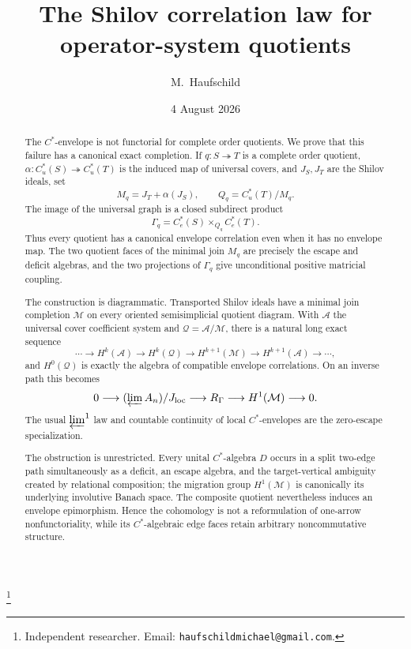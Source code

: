 \documentclass[11pt,a4paper]{amsart}
\theoremstyle{plain}
\theoremstyle{definition}
\newcommand{\Cu}{C_u^*}
\newcommand{\Ce}{C_e^*}
\begin{document}
\title[The Shilov correlation law]{The Shilov correlation law for operator-system quotients}

\author{M.~Haufschild}
\thanks{Independent researcher. Email: \texttt{haufschildmichael@gmail.com}.}

\date{4 August 2026}


\begin{abstract}
The $C^*$-envelope is not functorial for complete order quotients.  We prove that this failure has
a canonical exact completion.  If $q:S\twoheadrightarrow T$ is a complete order quotient,
$\alpha:\Cu(S)\twoheadrightarrow\Cu(T)$ is the induced map of universal covers, and $J_S,J_T$
are the Shilov ideals, set
\[
 M_q=J_T+\alpha(J_S),\qquad Q_q=\Cu(T)/M_q .
\]
The image of the universal graph is a closed subdirect product
\[
 \Gamma_q=\Ce(S)\times_{Q_q}\Ce(T).
\]
Thus every quotient has a canonical envelope correlation even when it has no envelope map.
The two quotient faces of the minimal join $M_q$ are precisely the escape and deficit algebras,
and the two projections of $\Gamma_q$ give unconditional positive matricial coupling.

The construction is diagrammatic.  Transported Shilov ideals have a minimal join completion
$\mathcal M$ on every oriented semisimplicial quotient diagram.  With $\mathcal A$ the universal
cover coefficient system and $\mathcal Q=\mathcal A/\mathcal M$, there is a natural long exact
sequence
\[
 \cdots\longrightarrow H^k(\mathcal A)\longrightarrow H^k(\mathcal Q)
 \longrightarrow H^{k+1}(\mathcal M)\longrightarrow H^{k+1}(\mathcal A)
 \longrightarrow\cdots ,
\]
and $H^0(\mathcal Q)$ is exactly the algebra of compatible envelope correlations.  On an inverse
path this becomes
\[
 0\longrightarrow(\varprojlim A_n)/J_{\rm loc}\longrightarrow R_\Gamma
 \longrightarrow H^1(\mathcal M)\longrightarrow0.
\]
The usual $\varprojlim^1$ law and countable continuity of local $C^*$-envelopes are the
zero-escape specialization.

The obstruction is unrestricted.  Every unital $C^*$-algebra $D$ occurs in a split two-edge path
simultaneously as a deficit, an escape algebra, and the target-vertical ambiguity created by
relational composition; the migration group $H^1(\mathcal M)$ is canonically its underlying
involutive Banach space.  The composite quotient nevertheless induces an envelope epimorphism.
Hence the cohomology is not a reformulation of one-arrow nonfunctoriality, while its
$C^*$-algebraic edge faces retain arbitrary noncommutative structure.
\end{abstract}
\end{document}
